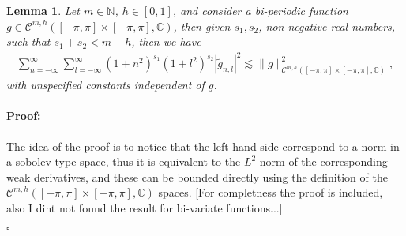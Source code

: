 \documentclass{article}
\newtheorem{lemma}[theorem]{Lemma}
\newenvironment{proof}{\paragraph{Proof:}}{\hfill$\square$}
\newcommand{\todo}[1]{{\color{red}[#1]}}
\newcommand{\IC}{{\mathbb C}}
\newcommand{\IN}{{\mathbb N}}
\newcommand{\cmspaceh}[4]{\mathcal{C}^{#1,#2} \left( #3, #4 \right)}
\begin{document}
\begin{lemma}
\label{lemma:cmdecay2}
Let $m \in \IN$, $h \in [0,1]$, and consider a bi-periodic function $g \in \cmspaceh{m}{h}{[-\pi,\pi]\times[-\pi,\pi]}{\IC}$, then given $s_1, s_2$, non negative real numbers, such that $s_1+s_2 < m+h$, then we have 
\begin{align*}
\sum_{n=-\infty}^{\infty}\sum_{l=-\infty}^{\infty}
(1+n^2)^{s_1} (1+l^2)^{s_2} |\widetilde{g}_{n,l}|^2 \lesssim \|g\|^2_{\cmspaceh{m}{h}{[-\pi,\pi]\times[-\pi,\pi]}{\IC}},
\end{align*}
with unspecified constants independent of $g$. 
\end{lemma}
\begin{proof}
The idea of the proof is to notice that the left hand side correspond to a norm in a sobolev-type space, thus it is equivalent to the $L^2$ norm of the corresponding weak derivatives, and these can be bounded directly using the definition of the $\cmspaceh{m}{h}{[-\pi,\pi]\times[-\pi,\pi]}{\IC}$ spaces. \todo{For completness the proof is included, also I dint not found the result for bi-variate functions...}


\end{proof}
\end{document}
